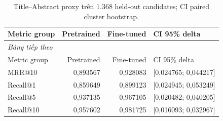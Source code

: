 \begingroup\small\setlength{\tabcolsep}{4pt}\renewcommand{\arraystretch}{1.16}
\begin{longtable}{p{.29\linewidth}rrp{.25\linewidth}}
\caption{Title--Abstract proxy trên 1.368 held-out candidates; CI paired cluster bootstrap.}\label{tab:proxy}\\
\toprule Metric group & Pretrained & Fine-tuned & CI 95\% delta \\
\midrule\endfirsthead
\multicolumn{4}{l}{\textit{Bảng tiếp theo}}\\
\toprule Metric group & Pretrained & Fine-tuned & CI 95\% delta \\
\midrule\endhead
\bottomrule\endfoot
MRR@10 & 0,893567 & 0,928083 & [0,024765; 0,044217] \\
Recall@1 & 0,859649 & 0,899123 & [0,024945; 0,053249] \\
Recall@5 & 0,937135 & 0,967105 & [0,020482; 0,040205] \\
Recall@10 & 0,957602 & 0,981725 & [0,016093; 0,032967] \\
\end{longtable}\endgroup
{}
